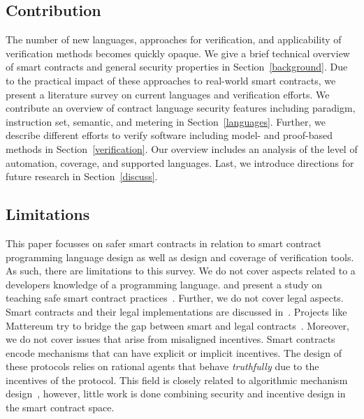 \subsection{Contribution} The number of new languages, approaches for verification, and applicability of verification methods becomes quickly opaque. 
We give a brief technical overview of smart contracts and general security properties in Section~\ref{background}. Due to the practical impact of these approaches to real-world smart contracts, we present a literature survey on current languages and verification efforts.
We contribute an overview of contract language security features including paradigm, instruction set, semantic, and metering in Section~\ref{languages}.
Further, we describe different efforts to verify software including model- and proof-based methods in Section~\ref{verification}. Our overview includes an analysis of the level of automation, coverage, and supported languages.
Last, we introduce directions for future research in Section~\ref{discuss}.

\subsection{Limitations}
This paper focusses on safer smart contracts in relation to smart contract programming language design as well as design and coverage of verification tools.
As such, there are limitations to this survey.
We do not cover aspects related to a developers knowledge of a programming language.
\citeauthor{Delmolino2016} and \citeauthor{DiAngelo2019} present a study on teaching safe smart contract practices~\cite{Delmolino2016,DiAngelo2019}.
Further, we do not cover legal aspects.
Smart contracts and their legal implementations are discussed in~\cite{Neal.2003,Governatori2006,Clack2016}.
Projects like Mattereum try to bridge the gap between smart and legal contracts~\cite{Gupta}.
Moreover, we do not cover issues that arise from misaligned incentives.
Smart contracts encode mechanisms that can have explicit or implicit incentives.
The design of these protocols relies on rational agents that behave \emph{truthfully} due to the incentives of the protocol.
This field is closely related to algorithmic mechanism design~\cite{Nisan2007}, however, little work is done combining security and incentive design in the smart contract space.

